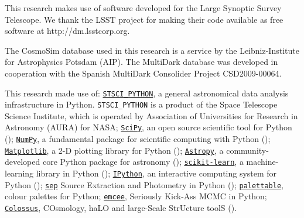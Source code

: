 \documentclass[a4paper,fleqn,usenatbib]{mnras}
\begin{document}
  This research makes use of software developed for the Large Synoptic Survey 
  Telescope. We thank the LSST project for making their code available as free 
  software at http://dm.lsstcorp.org.
  
  The CosmoSim database used in this research is a service by the Leibniz-Institute for 
  Astrophysics Potsdam (AIP).
  The MultiDark database was developed in cooperation with the Spanish MultiDark 
  Consolider Project CSD2009-00064.
  
  This research made use of:
  \href{http://www.stsci.edu/institute/software_hardware/pyraf/stsci\_python}{\texttt{STSCI\_PYTHON}},
      a general astronomical data analysis infrastructure in Python. 
      \texttt{STSCI\_PYTHON} is a product of the Space Telescope Science Institute, 
      which is operated by Association of Universities for Research 
      in Astronomy (AURA) for NASA;
  \href{http://www.scipy.org/}{\texttt{SciPy}},
      an open source scientific tool for Python (\citealt{SciPy});
  \href{http://www.numpy.org/}{\texttt{NumPy}}, 
      a fundamental package for scientific computing with Python (\citealt{NumPy});
  \href{http://matplotlib.org/}{\texttt{Matplotlib}}, 
      a 2-D plotting library for Python (\citealt{Matplotlib});
  \href{http://www.astropy.org/}{\texttt{Astropy}}, a community-developed 
      core Python package for astronomy (\citealt{AstroPy}); 
  \href{http://scikit-learn.org/stable/index.html}{\texttt{scikit-learn}},
      a machine-learning library in Python (\citealt{scikit-learn}); 
  \href{https://ipython.org}{\texttt{IPython}}, 
      an interactive computing system for Python (\citealt{IPython});
  \href{https://github.com/kbarbary/sep}{\texttt{sep}} 
      Source Extraction and Photometry in Python (\citealt{PythonSEP});
  \href{https://jiffyclub.github.io/palettable/}{\texttt{palettable}},
      colour palettes for Python;
  \href{http://dan.iel.fm/emcee/current/}{\texttt{emcee}}, 
      Seriously Kick-Ass MCMC in Python;
  \href{http://bdiemer.bitbucket.org/}{\texttt{Colossus}}, 
      COsmology, haLO and large-Scale StrUcture toolS (\citealt{Colossus}).




%
\end{document}
